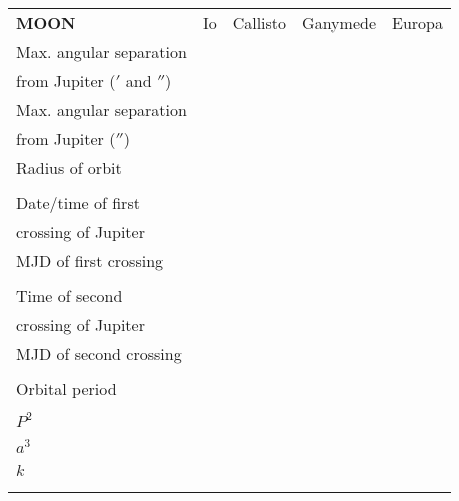 \newpage


\begin{center}
\begin{tabular}{|l|l|l|l|l|}
\noalign{\hrule}
{\bf MOON} & Io & Callisto & Ganymede & Europa \\
\noalign{\hrule}
Max. angular separation & \qquad\qquad\qquad\qquad & \qquad\qquad\qquad\qquad &
\qquad\qquad\qquad\qquad &\qquad\qquad\qquad\qquad \huge\strut\\
from Jupiter ($'$ and $''$) & & & &\huge\strut \\
\noalign{\hrule}
Max. angular separation & & & & \huge\strut\\
from Jupiter ($''$) & & & & \huge\strut\\
\noalign{\hrule}
Radius of orbit & & & & \huge\strut\\
& & & & \huge\strut\\
\noalign{\hrule}
Date/time of first & & & & \huge\strut\\
crossing of Jupiter &  & & & \huge\strut\\
\noalign{\hrule}
MJD of first crossing  & & & & \huge\strut\\
& & & & \huge\strut\\
\noalign{\hrule}
Time of second & & & & \huge\strut\\
crossing of Jupiter &  & & & \huge\strut\\
\noalign{\hrule}
MJD of second crossing  & & & & \huge\strut\\
& & & & \huge\strut\\
\noalign{\hrule}
Orbital period & & & & \huge\strut\\
& & & & \huge\strut\\
\noalign{\hrule}
$P^2$ & & & & \huge\strut\\
& & & & \huge\strut\\
\noalign{\hrule}
$a^3$ & & & & \huge\strut\\
& & & & \huge\strut\\
\noalign{\hrule}
$k$ & & & & \huge\strut\\
& & & & \huge\strut\\
\noalign{\hrule}
\end{tabular}
\end{center}

